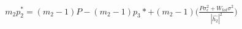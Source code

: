 \documentclass[preview]{standalone}
\begin{document}
\begin{align*}
m_2 p_2^\ast = \left(m_2 - 1\right) P - \left(m_2 - 1\right) p_3\ast + \left(m_2 - 1\right) \Bigg( \frac{P \sigma_\epsilon^2 + W_{tot} \sigma^2}{\left|\hat{h_2}\right|^2} \Bigg)
\end{align*}
\end{document}
